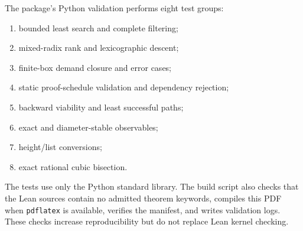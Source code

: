 The package's Python validation performs eight test groups:
\begin{enumerate}
  \item bounded least search and complete filtering;
  \item mixed-radix rank and lexicographic descent;
  \item finite-box demand closure and error cases;
  \item static proof-schedule validation and dependency rejection;
  \item backward viability and least successful paths;
  \item exact and diameter-stable observables;
  \item height/list conversions;
  \item exact rational cubic bisection.
\end{enumerate}
The tests use only the Python standard library.  The build script also checks that the Lean sources contain
no admitted theorem keywords, compiles this PDF when \texttt{pdflatex} is available, verifies the manifest,
and writes validation logs.  These checks increase reproducibility but do not replace Lean kernel checking.
